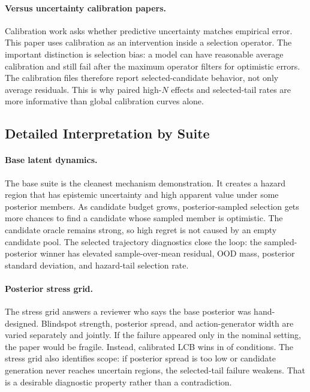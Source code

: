 \documentclass{article}
\begin{document}
\paragraph{Versus uncertainty calibration papers.}
Calibration work asks whether predictive uncertainty matches empirical error.
This paper uses calibration as an intervention inside a selection operator.
The important distinction is selection bias: a model can have reasonable
average calibration and still fail after the maximum operator filters for
optimistic errors. The calibration files therefore report selected-candidate
behavior, not only average residuals. This is why paired high-$N$ effects and
selected-tail rates are more informative than global calibration curves alone.

\subsection{Detailed Interpretation by Suite}

\paragraph{Base latent dynamics.}
The base suite is the cleanest mechanism demonstration. It creates a hazard
region that has epistemic uncertainty and high apparent value under some
posterior members. As candidate budget grows, posterior-sampled selection gets
more chances to find a candidate whose sampled member is optimistic. The
candidate oracle remains strong, so high regret is not caused by an empty
candidate pool. The selected trajectory diagnostics close the loop: the
sampled-posterior winner has elevated sample-over-mean residual, OOD mass,
posterior standard deviation, and hazard-tail selection rate.

\paragraph{Posterior stress grid.}
The stress grid answers a reviewer who says the base posterior was
hand-designed. Blindspot strength, posterior spread, and action-generator width
are varied separately and jointly. If the failure appeared only in the nominal
setting, the paper would be fragile. Instead, calibrated LCB wins in
\VThreeStressLCBWinConditions{} of \VThreeStressConditions{} conditions. The
stress grid also identifies scope: if posterior spread is too low or candidate
generation never reaches uncertain regions, the selected-tail failure weakens.
That is a desirable diagnostic property rather than a contradiction.
\end{document}
